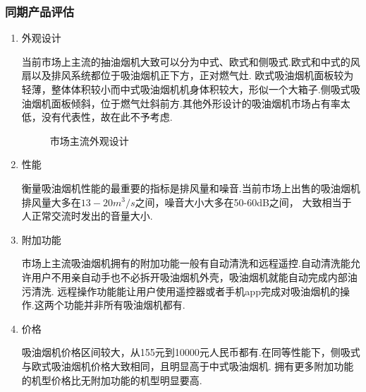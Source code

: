 \subsubsection{同期产品评估}
\begin{enumerate}
\item 外观设计

	   当前市场上主流的抽油烟机大致可以分为中式、欧式和侧吸式.欧式和中式的风扇以及排风系统都位于吸油烟机正下方，正对燃气灶.
       欧式吸油烟机面板较为轻薄，整体体积较小而中式吸油烟机机身体积较大，形似一个大箱子.侧吸式吸油烟机面板倾斜，位于燃气灶斜前方.其他外形设计的吸油烟机市场占有率太低，没有代表性，故在此不予考虑.

      \begin{figure}[H]
      \centering
      \caption{市场主流外观设计}
      \label{市场主流外观设计}
      \end{figure}

\item 性能

	  衡量吸油烟机性能的最重要的指标是排风量和噪音.当前市场上出售的吸油烟机排风量大多在$13-20m^3/s$之间，噪音大小大多在50-60dB之间，
      大致相当于人正常交流时发出的音量大小.

\item 附加功能

	  市场上主流吸油烟机拥有的附加功能一般有自动清洗和远程遥控.自动清洗能允许用户不用亲自动手也不必拆开吸油烟机外壳，吸油烟机就能自动完成内部油污清洗.
      远程操作功能能让用户使用遥控器或者手机app完成对吸油烟机的操作.这两个功能并非所有吸油烟机都有.

\item 价格

	  吸油烟机价格区间较大，从155元到10000元人民币都有.在同等性能下，侧吸式与欧式吸油烟机价格大致相同，且明显高于中式吸油烟机.
      拥有更多附加功能的机型价格比无附加功能的机型明显要高.

\end{enumerate}


